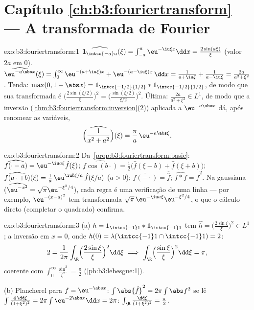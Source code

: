 \section*{Capítulo \ref{ch:b3:fouriertransform} --- A transformada de
Fourier}

\begin{solution}{exo:b3:fouriertransform:1}
$\widehat{\mathbf 1_{\intcc{-a}a}}(\xi) =
\int_{-a}^a\eu^{-\iu\xi x}\dd x = \frac{2\sin(a\xi)}{\xi}$
(valor $2a$ em $0$).
$\widehat{\eu^{-a\abs x}}(\xi) = \int_0^\infty\eu^{-(a +
\iu\xi)x} + \eu^{-(a - \iu\xi)x}\,\dd x = \frac1{a + \iu\xi} +
\frac1{a - \iu\xi} = \frac{2a}{a^2 + \xi^2}$.
Tenda: $\max(0, 1 - \abs x) = \mathbf 1_{\intcc{-1/2}{1/2}} *
\mathbf 1_{\intcc{-1/2}{1/2}}$, de modo que sua transformada é
$\bigl(\frac{2\sin(\xi/2)}\xi\bigr)^2 =
\bigl(\frac{\sin(\xi/2)}{\xi/2}\bigr)^2$.
Última: $\frac{2a}{a^2+\xi^2} \in L^1$, de modo que a inversão
(\cref{thm:b3:fouriertransform:inversion}(2)) aplicada a
$\eu^{-a\abs x}$ dá, após renomear as variáveis,
\[
\widehat{\Bigl(\frac1{x^2 + a^2}\Bigr)}(\xi) =
\frac{\pi}{a}\,\eu^{-a\abs\xi} .
\]
\end{solution}

\begin{solution}{exo:b3:fouriertransform:2}
Da~\cref{prop:b3:fouriertransform:basic}:
$\widehat{f(\cdot - a)} = \eu^{-\iu a\xi}\hat f(\xi)$;
$\widehat{f\cos(b\cdot)} = \frac12\bigl(\hat f(\xi - b) + \hat
f(\xi + b)\bigr)$;
$\widehat{f(a\cdot + b)}(\xi) = \frac1a\,\eu^{\iu
b\xi/a}\,\hat f(\xi/a)$ ($a > 0$);
$\widehat{\overline{f(-\cdot)}} = \overline{\hat f}$;
$\widehat{f * f} = \hat f^2$. Na gaussiana
($\widehat{\eu^{-x^2}} = \sqrt\pi\eu^{-\xi^2/4}$), cada regra é
uma verificação de uma linha --- por exemplo, $\eu^{-(x-a)^2}$ tem transformada
$\sqrt\pi\,\eu^{-\iu a\xi}\eu^{-\xi^2/4}$, o que o cálculo
direto (completar o quadrado) confirma.
\end{solution}

\begin{solution}{exo:b3:fouriertransform:3}
(a) $h = \mathbf 1_{\intcc{-1}1}*\mathbf 1_{\intcc{-1}1}$ tem
$\hat h = \bigl(\frac{2\sin\xi}\xi\bigr)^2 \in L^1$; a inversão
em $x = 0$, onde $h(0) = \lambda(\intcc{-1}1\cap\intcc{-1}1)
= 2$:
\[
2 = \frac1{2\pi}\int_\R\Bigl(\frac{2\sin\xi}\xi\Bigr)^2
\dd\xi
\ \Longrightarrow\
\int_\R\Bigl(\frac{\sin\xi}\xi\Bigr)^2\dd\xi = \pi ,
\]
coerente com $\int_0^\infty\frac{\sin^2}{\xi^2} =
\frac\pi2$ (\cref{pb:b3:lebesgue:1}).

(b) Plancherel para $f = \eu^{-\abs x}$: $\int\abs{\hat f}^2 =
2\pi\int\abs f^2$ se lê $\int\frac{4\,\dd\xi}{(1 + \xi^2)^2} =
2\pi\int\eu^{-2\abs x}\dd x = 2\pi$:
$\int_\R\frac{\dd\xi}{(1+\xi^2)^2} = \frac\pi2$.
\end{solution}

